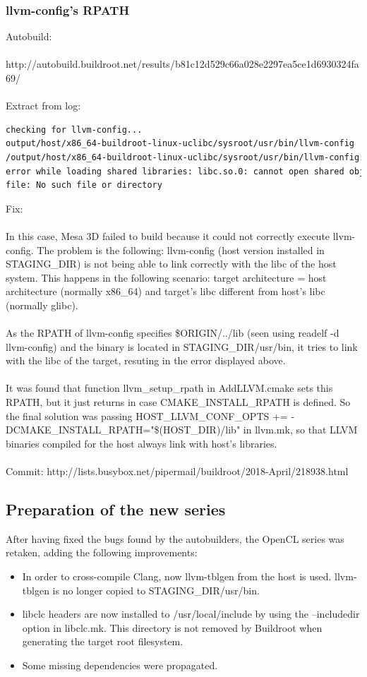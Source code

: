 \documentclass[12pt,a4paper,oneside]{article}
\begin{document}
\subsubsection*{llvm-config's RPATH}
Autobuild:\\\\
http://autobuild.buildroot.net/results/b81c12d529c66a028e2297ea5ce1d6930324fa69/\\\\
Extract from log:
\begin{lstlisting}[language=sh,keywords={}]
checking for llvm-config...
output/host/x86_64-buildroot-linux-uclibc/sysroot/usr/bin/llvm-config
/output/host/x86_64-buildroot-linux-uclibc/sysroot/usr/bin/llvm-config:
error while loading shared libraries: libc.so.0: cannot open shared object
file: No such file or directory
\end{lstlisting}
Fix:\\\\
In this case, Mesa 3D failed to build because it could not correctly execute
llvm-config. The problem is the following: llvm-config (host version installed in
STAGING\_DIR) is not being able to link correctly with the libc of the host system.
This happens in the following scenario: target architecture = host architecture
(normally x86\_64) and target's libc different from host's libc (normally glibc).\\\\
As the RPATH of llvm-config specifies \$ORIGIN/../lib (seen using readelf -d
llvm-config) and the binary is located in STAGING\_DIR/usr/bin, it tries to link
with the libc of the target, resuting in the error displayed above.\\\\
It was found that function {\selectfont llvm\_setup\_rpath} in
AddLLVM.cmake sets this RPATH, but it just returns in case CMAKE\_INSTALL\_RPATH
is defined. So the final solution was passing HOST\_LLVM\_CONF\_OPTS += -DCMAKE\_INSTALL\_RPATH="\$(HOST\_DIR)/lib"
in llvm.mk, so that LLVM binaries compiled for the host always link with host's
libraries.\\\\
Commit: http://lists.busybox.net/pipermail/buildroot/2018-April/218938.html

\subsection*{Preparation of the new series}
After having fixed the bugs found by the autobuilders, the OpenCL series was
retaken, adding the following improvements:
\begin{itemize}
  \item In order to cross-compile Clang, now llvm-tblgen from the host is used.
  llvm-tblgen is no longer copied to STAGING\_DIR/usr/bin.
  \item libclc headers are now installed to /usr/local/include by using the
  --includedir option in libclc.mk. This directory is not removed by Buildroot
  when generating the target root filesystem.
  \item Some missing dependencies were propagated.
\end{itemize}
\newpage
\end{document}
